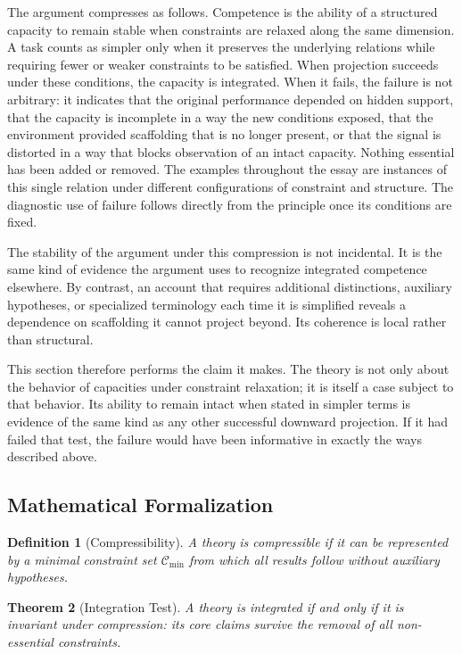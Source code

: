 \documentclass[12pt, a4paper]{article}
\newtheorem{definition}{Definition}[section]
\newtheorem{theorem}[definition]{Theorem}
\begin{document}
The argument compresses as follows. Competence is the ability of a structured capacity to remain stable when constraints are relaxed along the same dimension. A task counts as simpler only when it preserves the underlying relations while requiring fewer or weaker constraints to be satisfied. When projection succeeds under these conditions, the capacity is integrated. When it fails, the failure is not arbitrary: it indicates that the original performance depended on hidden support, that the capacity is incomplete in a way the new conditions exposed, that the environment provided scaffolding that is no longer present, or that the signal is distorted in a way that blocks observation of an intact capacity. Nothing essential has been added or removed. The examples throughout the essay are instances of this single relation under different configurations of constraint and structure. The diagnostic use of failure follows directly from the principle once its conditions are fixed.

The stability of the argument under this compression is not incidental. It is the same kind of evidence the argument uses to recognize integrated competence elsewhere. By contrast, an account that requires additional distinctions, auxiliary hypotheses, or specialized terminology each time it is simplified reveals a dependence on scaffolding it cannot project beyond. Its coherence is local rather than structural.

This section therefore performs the claim it makes. The theory is not only about the behavior of capacities under constraint relaxation; it is itself a case subject to that behavior. Its ability to remain intact when stated in simpler terms is evidence of the same kind as any other successful downward projection. If it had failed that test, the failure would have been informative in exactly the ways described above.

\subsection*{Mathematical Formalization}

\begin{definition}[Compressibility]
A theory is compressible if it can be represented by a minimal constraint set $\mathcal{C}_{\min}$ from which all results follow without auxiliary hypotheses.
\end{definition}

\begin{theorem}[Integration Test]
A theory is integrated if and only if it is invariant under compression: its core claims survive the removal of all non-essential constraints.
\end{theorem}
\end{document}
